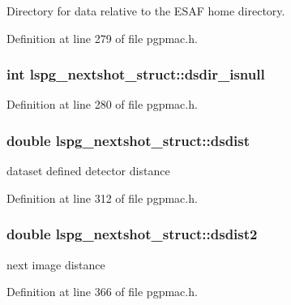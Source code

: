 Directory for data relative to the E\-S\-A\-F home directory. 



Definition at line 279 of file pgpmac.\-h.

\hypertarget{structlspg__nextshot__struct_a8dea57b78b92d67d83ccbb6ed6da13ca}{
\subsubsection[{dsdir\-\_\-isnull}]{\setlength{\rightskip}{0pt plus 5cm}int lspg\-\_\-nextshot\-\_\-struct\-::dsdir\-\_\-isnull}}\label{structlspg__nextshot__struct_a8dea57b78b92d67d83ccbb6ed6da13ca}


Definition at line 280 of file pgpmac.\-h.

\hypertarget{structlspg__nextshot__struct_acab9431a911f5bb11296cbfb271fb83a}{
\subsubsection[{dsdist}]{\setlength{\rightskip}{0pt plus 5cm}double lspg\-\_\-nextshot\-\_\-struct\-::dsdist}}\label{structlspg__nextshot__struct_acab9431a911f5bb11296cbfb271fb83a}


dataset defined detector distance 



Definition at line 312 of file pgpmac.\-h.

\hypertarget{structlspg__nextshot__struct_a516827749068577217b27860a01e6041}{
\subsubsection[{dsdist2}]{\setlength{\rightskip}{0pt plus 5cm}double lspg\-\_\-nextshot\-\_\-struct\-::dsdist2}}\label{structlspg__nextshot__struct_a516827749068577217b27860a01e6041}


next image distance 



Definition at line 366 of file pgpmac.\-h.

